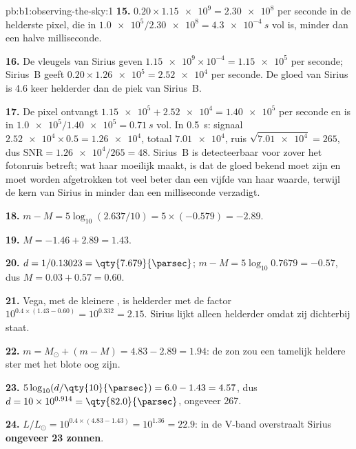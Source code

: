 \begin{solution}{pb:b1:observing-the-sky:1}
\textbf{15.} $0.20\times\num{1.15e9} = \num{2.30e8}$ per seconde in de helderste pixel, die
in $\num{1.0e5}/\num{2.30e8} =
\qty{4.3e-4}{s}$ vol is, minder dan een halve milliseconde.

\textbf{16.} De vleugels van Sirius geven $\num{1.15e9}\times10^{-4} =
\num{1.15e5}$ per seconde; Sirius~B geeft $0.20\times\num{1.26e5} =
\num{2.52e4}$ per seconde. De gloed van Sirius is 4.6 keer helderder dan de piek van Sirius~B.

\textbf{17.} De pixel ontvangt $\num{1.15e5} + \num{2.52e4} = \num{1.40e5}$
per seconde en is in $\num{1.0e5}/\num{1.40e5} = \qty{0.71}{s}$ vol. In
\qty{0.5}{s}: signaal $\num{2.52e4}\times0.5 = \num{1.26e4}$, totaal
$\num{7.01e4}$, ruis $\sqrt{\num{7.01e4}} = 265$, dus $\mathrm{SNR} =
\num{1.26e4}/265 = 48$. Sirius~B is detecteerbaar voor zover het fotonruis betreft; wat haar
moeilijk maakt, is dat de gloed bekend moet zijn en moet worden afgetrokken tot veel beter dan
een vijfde van haar waarde, terwijl de kern van Sirius in minder dan een milliseconde verzadigt.

\textbf{18.} $m - M = 5\log_{10}(2.637/10) = 5\times(-0.579) = -2.89$.

\textbf{19.} $M = -1.46 + 2.89 = 1.43$.

\textbf{20.} $d = 1/0.13023 = \qty{7.679}{\parsec}$;
$m - M = 5\log_{10}0.7679 = -0.57$, dus $M = 0.03 + 0.57 = 0.60$.

\textbf{21.} Vega, met de kleinere , is helderder met de factor
$10^{0.4\times(1.43 - 0.60)} = 10^{0.332} = 2.15$. Sirius lijkt alleen helderder omdat zij
dichterbij staat.

\textbf{22.} $m = M_\odot + (m - M) = 4.83 - 2.89 = 1.94$: de zon zou een tamelijk heldere
ster met het blote oog zijn.

\textbf{23.} $5\log_{10}(d/\qty{10}{\parsec}) = 6.0 - 1.43 = 4.57$, dus
$d = 10\times10^{0.914} = \qty{82.0}{\parsec}$, ongeveer \qty{267}{\lightyear}.

\textbf{24.} $L/L_\odot = 10^{0.4\times(4.83 - 1.43)} = 10^{1.36} = 22.9$:
in de V-band overstraalt Sirius \textbf{ongeveer 23 zonnen}.
\end{solution}
